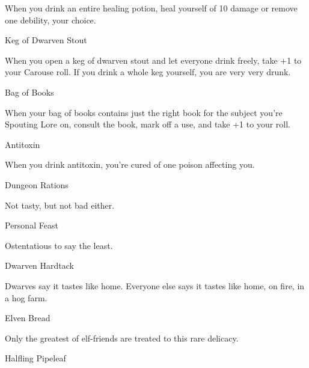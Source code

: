        

When you drink an entire healing potion, heal yourself of 10 damage or remove one debility, your choice.

       

Keg of Dwarven Stout	 

       

When you open a keg of dwarven stout and let everyone drink freely, take +1 to your Carouse roll. If you drink a whole keg yourself, you are very very drunk.

       

Bag of Books	 

       

When your bag of books contains just the right book for the subject you're Spouting Lore on, consult the book, mark off a use, and take +1 to your roll.

       

Antitoxin	 

       

When you drink antitoxin, you're cured of one poison affecting you.

       

Dungeon Rations	 

       

Not tasty, but not bad either.

       

Personal Feast	 

       

Ostentatious to say the least.

       

Dwarven Hardtack	 

       

Dwarves say it tastes like home. Everyone else says it tastes like home, on fire, in a hog farm.

       

Elven Bread	 

       

Only the greatest of elf-friends are treated to this rare delicacy.

       

Halfling Pipeleaf	 

       

